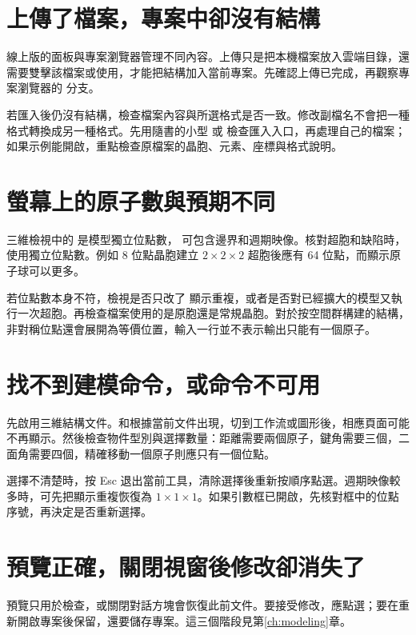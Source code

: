 \section{上傳了檔案，專案中卻沒有結構}

線上版的面板與專案瀏覽器管理不同內容。上傳只是把本機檔案放入雲端目錄，還需要雙擊該檔案或使用，才能把結構加入當前專案。先確認上傳已完成，再觀察專案瀏覽器的  分支。

若匯入後仍沒有結構，檢查檔案內容與所選格式是否一致。修改副檔名不會把一種格式轉換成另一種格式。先用隨書的小型 \mbox{} 或 \mbox{} 檢查匯入入口，再處理自己的檔案；如果示例能開啟，重點檢查原檔案的晶胞、元素、座標與格式說明。

\section{螢幕上的原子數與預期不同}

三維檢視中的  是模型獨立位點數， 可包含邊界和週期映像。核對超胞和缺陷時，使用獨立位點數。例如 8 位點晶胞建立 $2\times2\times2$ 超胞後應有 64 位點，而顯示原子球可以更多。

若位點數本身不符，檢視是否只改了  顯示重複，或者是否對已經擴大的模型又執行一次超胞。再檢查檔案使用的是原胞還是常規晶胞。對於按空間群構建的結構，非對稱位點還會展開為等價位置，輸入一行並不表示輸出只能有一個原子。

\section{找不到建模命令，或命令不可用}

先啟用三維結構文件。和根據當前文件出現，切到工作流或圖形後，相應頁面可能不再顯示。然後檢查物件型別與選擇數量：距離需要兩個原子，鍵角需要三個，二面角需要四個，精確移動一個原子則應只有一個位點。

選擇不清楚時，按 Esc 退出當前工具，清除選擇後重新按順序點選。週期映像較多時，可先把顯示重複恢復為 $1\times1\times1$。如果引數框已開啟，先核對框中的位點序號，再決定是否重新選擇。

\section{預覽正確，關閉視窗後修改卻消失了}

預覽只用於檢查，或關閉對話方塊會恢復此前文件。要接受修改，應點選；要在重新開啟專案後保留，還要儲存專案。這三個階段見第\ref{ch:modeling}章。

